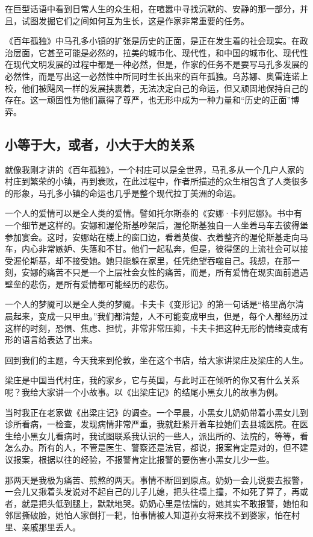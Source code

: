 \documentclass[fontset=fandol,12pt,a5paper]{ctexbook}
\begin{document}
在巨型话语中看到日常人生的众生相，在喧嚣中寻找沉默的、安静的那一部分，并且，试图发掘它们之间如何互为生长，这是作家非常重要的任务。

《百年孤独》中马孔多小镇的扩张是历史的正面，是正在发生着的社会现实。在政治层面，它甚至可能是必然的，拉美的城市化、现代性，和中国的城市化、现代性在现代文明发展的过程中都是一种必然，但是，作家的任务不是要写马孔多发展的必然性，而是写出这一必然性中所同时生长出来的百年孤独。乌苏娜、奥雷连诺上校，他们被飓风一样的发展挟裹着，无法决定自己的命运，但又顽固地保持自己的存在。这一顽固性为他们赢得了尊严，也无形中成为一种力量和“历史的正面”博弈。

\subsection{小等于大，或者，小大于大的关系}
就像我刚才讲的《百年孤独》，一个村庄可以是全世界，马孔多从一个几户人家的村庄到繁荣的小镇，再到衰败，在此过程中，作者所描述的众生相包含了人类很多的形象，马孔多小镇的命运也几乎是整个现代拉丁美洲的命运。

一个人的爱情可以是全人类的爱情。譬如托尔斯泰的《安娜·卡列尼娜》。书中有一个细节是这样的。安娜和渥伦斯基吵架后，渥伦斯基独自一人坐着马车去彼得堡参加宴会。这时，安娜站在楼上的窗口边，看着英俊、衣着整齐的渥伦斯基走向马车，内心非常嫉妒、失落和不甘。他们一起私奔，但是，彼得堡的上流社会可以接受渥伦斯基，却不接受她。她只能躲在家里，任凭绝望吞噬自己。我想，在那一刻，安娜的痛苦不只是一个上层社会女性的痛苦，而是，所有爱情在现实面前遭遇壁垒的悲伤，是所有爱情都可能经历的悲伤。

一个人的梦魇可以是全人类的梦魇。卡夫卡《变形记》的第一句话是“格里高尔清晨起来，变成一只甲虫。”我们都清楚，人不可能变成甲虫，但是，每个人都经历过这样的时刻，恐惧、焦虑、担忧，非常非常压抑，卡夫卡把这种无形的情绪变成有形的语言给表达了出来。

回到我们的主题，今天我来到伦敦，坐在这个书店，给大家讲梁庄及梁庄的人生。

梁庄是中国当代村庄，我的家乡，它与英国，与此时正在倾听的你又有什么关系呢？我给大家讲一个小故事。以《出梁庄记》的结尾小黑女儿的故事为例。

当时我正在老家做《出梁庄记》的调查。一个早晨，小黑女儿奶奶带着小黑女儿到诊所看病，一检查，发现病情非常严重，我就赶紧开着车拉她们去县城医院。在医生给小黑女儿看病时，我试图联系我认识的一些人，派出所的、法院的，等等，看怎么办。所有的人，不管是医生、警察还是法官，都说，报案肯定是对的，但不建议报案，根据以往的经验，不报警肯定比报警的要伤害小黑女儿少一些。

那两天是我极为痛苦、煎熬的两天。事情不断回到原点。奶奶一会儿说要去报警，一会儿又揪着头发说对不起自己的儿子儿媳，把头往墙上撞，不如死了算了，再或者，就是把头低到腿上，默默地哭。奶奶心里是怯懦的，她其实不敢报警，她怕和邻居撕破脸，她怕人家倒打一耙，怕事情被人知道孙女将来找不到婆家，怕在村里、亲戚那里丢人。
\end{document}
